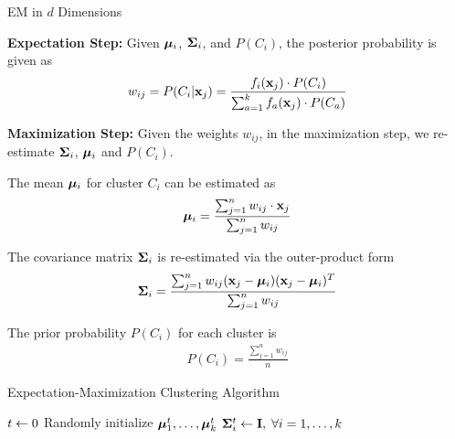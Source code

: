 \begin{frame}{EM in $d$ Dimensions}

{\bf Expectation Step:}
Given ${\bm \mu}_i$, ${\bm \Sigma}_i$, and $P(C_i)$, the posterior probability is
given as 
\begin{align*}
  w_{ij} = P(C_i | \mathbf{x}_{j}) 
 = \frac{f_i(\mathbf{x}_{j}) \cdot P(C_{i})}
    {\sum_{a=1}^k f_a(\mathbf{x}_{j}) \cdot P(C_{a})}
\end{align*}


\medskip
{\bf Maximization Step:}
Given the weights $w_{ij}$, in the maximization step, we
re-estimate ${\bm \Sigma}_i$, ${\bm \mu}_i$ and $P(C_i)$.

The mean ${\bm \mu}_i$ for cluster $C_i$ can be estimated as
\begin{align*}
    {\bm \mu}_i = \frac{\sum_{j=1}^n w_{ij} \cdot \mathbf{x}_{j}}
                {\sum_{j=1}^n w_{ij}}
\end{align*}

The covariance matrix ${\bm \Sigma}_i$ is re-estimated via the
outer-product form
\begin{align*}
  {\bm \Sigma}_i = \frac{\sum_{j=1}^n w_{ij}
                    (\mathbf{x}_{j}-{\bm \mu}_{i})(\mathbf{x}_{j}-{\bm \mu}_{i})^T}
                    {\sum_{j=1}^n w_{ij}}
\end{align*}

The prior probability $P(C_i)$ for each cluster is 
\begin{align*}
    P(C_i) = \frac{\sum_{j=1}^n w_{ij}}{n}
\end{align*}
\end{frame}



\begin{frame}[fragile]{Expectation-Maximization Clustering Algorithm}
\begin{algorithm}[H]
\Algorithm{}
$t \leftarrow 0$\;
Randomly initialize ${\bm \mu}^t_1,\ldots,{\bm \mu}^t_k$\;
${\bm \Sigma}_i^t \leftarrow \mathbf{I},\;\forall i=1,\dots,k$\;
\end{algorithm}
\end{frame}



